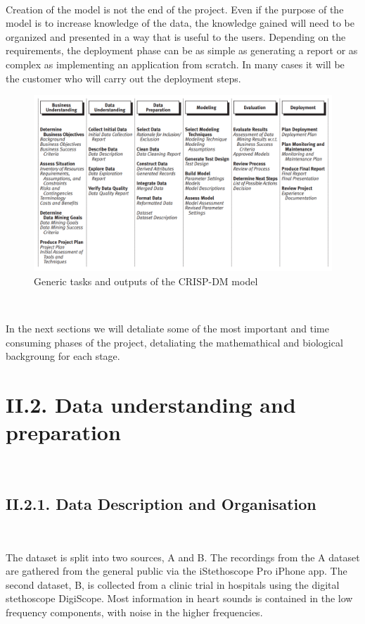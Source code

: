 \documentclass[11pt, a4papper]{report}
\theoremstyle{plain}
\theoremstyle{definition}
\theoremstyle{definition}
\theoremstyle{proposition}
\begin{document}
\

Creation of the model is not the end of the project. Even if the purpose of the model is to increase knowledge of the data, the knowledge gained will need to be organized and presented in a way that is useful to the users. Depending on the requirements, the deployment phase can be as simple as generating a report or as complex as implementing an application from scratch. In many cases it will be the customer who will carry out the deployment steps. 



\begin{figure}[h]
\includegraphics[width=16.2cm]{crispt.png}
\centering
\caption{Generic tasks and outputs of the CRISP-DM model}
\end{figure}
\

In the next sections we will detaliate some of the most important and time consuming phases of the project, detaliating the mathemathical and biological backgroung for each stage.
\

\section*{II.2. Data understanding and preparation}

\

\subsection*{II.2.1. Data Description and Organisation}

\

The dataset is split into two sources, A and B. The recordings from the A dataset are gathered from the general public via the iStethoscope Pro iPhone app. The second dataset, B, is collected from a clinic trial in hospitals using the digital stethoscope DigiScope. Most information in heart sounds is contained in the low frequency components, with noise in the higher frequencies.
\\
\end{document}
